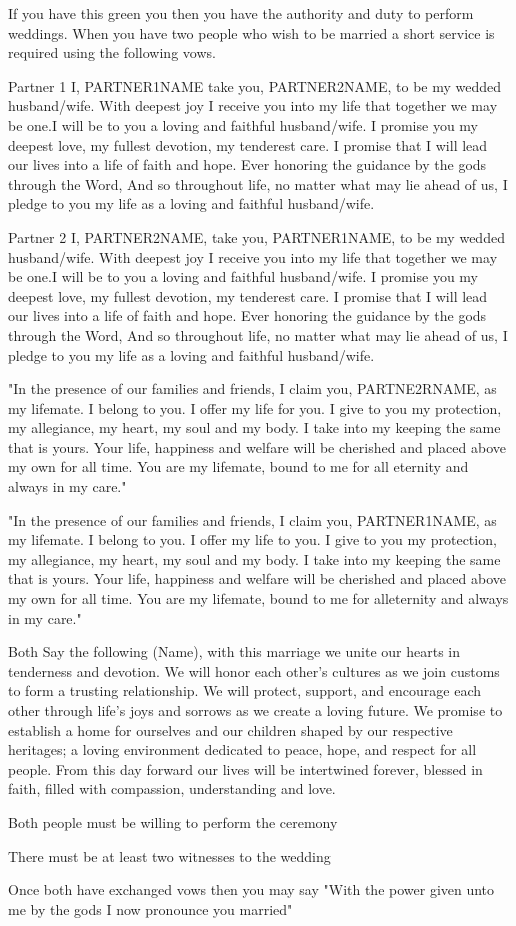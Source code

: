 \documentclass[green]{guildcamp3}
\begin{document}
	
	\name{\gWedding{}}
		
	If you have this green you then you have the authority and duty to perform weddings. When you have two people who wish to be married a short service is required using the following vows. 
	
	Partner 1
	I, PARTNER1NAME take you, PARTNER2NAME, to be my wedded husband/wife. With deepest joy I receive you into my life that together we may be one.I will be to you a loving and faithful husband/wife. I promise you my deepest love, my fullest devotion, my tenderest care. I promise that I will lead our lives into a life of faith and hope. Ever honoring the guidance by the gods through the Word, And so throughout life, no matter what may lie ahead of us, I pledge to you my life as a loving and faithful husband/wife.
	
	Partner 2
	I, PARTNER2NAME, take you, PARTNER1NAME, to be my wedded husband/wife. With deepest joy I receive you into my life that together we may be one.I will be to you a loving and faithful husband/wife. I promise you my deepest love, my fullest devotion, my tenderest care. I promise that I will lead our lives into a life of faith and hope. Ever honoring the guidance by the gods through the Word, And so throughout life, no matter what may lie ahead of us, I pledge to you my life as a loving and faithful husband/wife.
	
	
	"In the presence of our families and friends, I claim you, PARTNE2RNAME, as my lifemate. I belong to you. I offer my life for you. I give to you my protection, my allegiance, my heart, my soul and my body. I take into my keeping the same that is yours. Your life, happiness and welfare will be cherished and placed above my own for all time. You are my lifemate, bound to me for all eternity and always in my care."
	
	"In the presence of our families and friends, I claim you, PARTNER1NAME, as my lifemate. I belong to you. I offer my life to you. I give to you my protection, my allegiance, my heart, my soul and my body. I take into my keeping the same that is yours. Your life, happiness and welfare will be cherished and placed above my own for all time. You are my lifemate, bound to me for alleternity and always in my care."
	
	Both Say the following
	(Name), with this marriage we unite our hearts in tenderness and devotion. We will honor each other's cultures as we join customs to form a trusting relationship. We will protect, support, and encourage each other through life's joys and sorrows as we create a loving future. We promise to establish a home for ourselves and our children shaped by our respective heritages; a loving environment dedicated to peace, hope, and respect for all people. From this day forward our lives will be intertwined forever, blessed in faith, filled with compassion, understanding and love.
	
	
	
	
	\begin{enum}[Directions]
		\item Both people must be willing to perform the ceremony
		\item There must be at least two witnesses to the wedding 
		\item Once both have exchanged vows then you may say "With the power given unto me by the gods I now pronounce you married"

	\end{enum}
	
	
\end{document}
